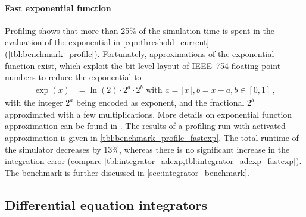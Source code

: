 \paragraph{Fast exponential function}
Profiling shows that more than 25\% of the simulation time is spent in the evaluation of the exponential in \cref{eqn:threshold_current} (\cref{tbl:benchmark_profile}). Fortunately, approximations of the exponential function exist, which exploit the bit-level layout of IEEE~754 floating point numbers to reduce the exponential to
\begin{align}
	\exp(x) &= \ln(2) \cdot 2^a \cdot 2^b \text{ with } a = \lfloor x \rfloor, b = x - a, b \in [0, 1]\,,
\end{align}
with the integer $2^a$ being encoded as exponent, and the fractional $2^b$ approximated with a few multiplications. More details on exponential function approximation can be found in \cite{schraudolph1999fast}. The results of a profiling run with activated approximation is given in \cref{tbl:benchmark_profile_fastexp}. The total runtime of the simulator decreases by 13\%, whereas there is no significant increase in the integration error (compare \cref{tbl:integrator_adexp,tbl:integrator_adexp_fastexp}). The benchmark is further discussed in \cref{sec:integrator_benchmark}.


\subsection{Differential equation integrators}
\label{sec:dgl_integrator}

